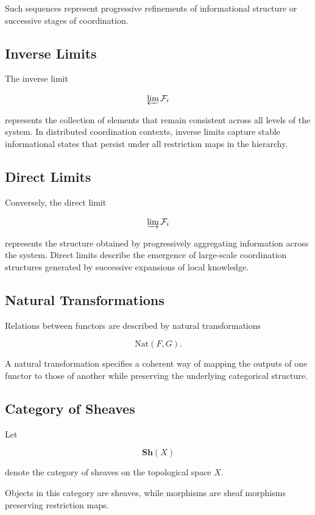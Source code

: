 \documentclass[12pt]{article}
\begin{document}
Such sequences represent progressive refinements of informational structure or successive stages of coordination.

\subsection{Inverse Limits}

The inverse limit

\[
\varprojlim \mathcal{F}_i
\]

represents the collection of elements that remain consistent across all levels of the system. In distributed coordination contexts, inverse limits capture stable informational states that persist under all restriction maps in the hierarchy.

\subsection{Direct Limits}

Conversely, the direct limit

\[
\varinjlim \mathcal{F}_i
\]

represents the structure obtained by progressively aggregating information across the system. Direct limits describe the emergence of large-scale coordination structures generated by successive expansions of local knowledge.

\subsection{Natural Transformations}

Relations between functors are described by natural transformations

\[
\mathrm{Nat}(F,G).
\]

A natural transformation specifies a coherent way of mapping the outputs of one functor to those of another while preserving the underlying categorical structure.

\subsection{Category of Sheaves}

Let

\[
\mathbf{Sh}(X)
\]

denote the category of sheaves on the topological space $X$.

Objects in this category are sheaves, while morphisms are sheaf morphisms preserving restriction maps.
\end{document}
